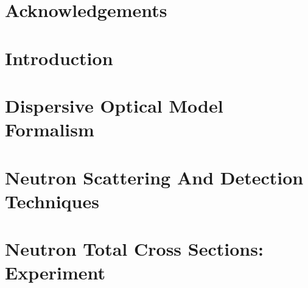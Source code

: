 \documentclass[twosided, 12pt]{book} %
\newcommand\blankpage{%
    \null
    \thispagestyle{empty}%
    \addtocounter{page}{-1}%
\newpage}
\begin{document}
\frontmatter



\begingroup
\let\cleardoublepage\clearpage
\tableofcontents
\endgroup

\fancyhead{}
\fancyhead[LO]{\MakeUppercase{\leftmark}}

\begingroup
\let\cleardoublepage\clearpage
{}
\listoffigures
\endgroup

\clearpage

\fancyhead{}
\fancyhead[LO]{\MakeUppercase{\leftmark}}

\begingroup
\let\cleardoublepage\clearpage
{}
\listoftables
\endgroup

\clearpage
{}
\fancyhead{}

\begingroup
\let\cleardoublepage\clearpage
\chapter*{Acknowledgements}

\endgroup



\afterpage{\blankpage}
\clearpage

\mainmatter

\fancyhead{} %
\fancyhead[LE]{\MakeUppercase{\rightmark}} %

\chapter{Introduction} \label{introduction}


\chapter{Dispersive Optical Model Formalism} \label{DOMFormalism}


\chapter{Neutron Scattering And Detection Techniques} \label{Techniques}


\chapter{Neutron Total Cross Sections: Experiment} \label{TCSExperiment}

\end{document}
